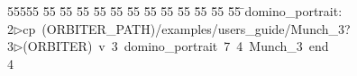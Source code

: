 %
%
\begin{tabbing}
55555 \= 55 \= 55 \= 55 \= 55 \= 55 \= 55 \= 55 \= 55 \= 55 \= 55 \= 55 \= 55 \= \>domino\_portrait:\\[0pt]
2\>$\triangleright$\>cp\ (ORBITER\_PATH)/examples/users\_guide/Munch\_3?\ \\[0pt]
3\>$\triangleright$\>(ORBITER)\ v\ 3\ domino\_portrait\ 7\ 4\ Munch\_3\ end\\[0pt]
4\>\end{tabbing}
